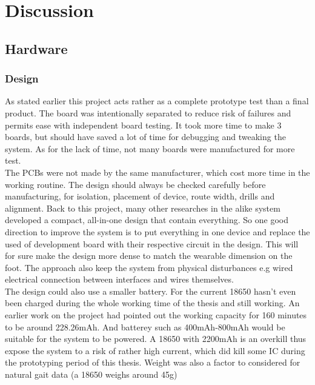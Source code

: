 \documentclass[12 pt, a4paper]{thesis}
\begin{document}
\chapter{Discussion}
\section{Hardware}
\subsection{Design}
As stated earlier this project acts rather as a complete prototype test than a final product. The board was intentionally separated to reduce risk of failures and permits ease with independent board testing. It took more time to make 3 boards, but should have saved a lot of time for debugging and tweaking the system. As for the lack of time, not many boards were manufactured for more test.\\
The PCBs were not made by the same manufacturer, which cost more time in the working routine. The design should always be checked carefully before manufacturing, for isolation, placement of device, route width, drills and alignment. Back to this project, many other researches in the alike system developed a compact, all-in-one design that contain everything\cite{Shuo}\cite{Kim}\cite{Nilsson}. So one good direction to improve the system is to put everything in one device and replace the used of development board with their respective circuit in the design. This will for sure make the design more dense to match the wearable dimension on the foot. The approach also keep the system from physical disturbances e.g wired electrical connection between interfaces and wires themselves.\\
The design could also use a smaller battery. For the current 18650 hasn't even been charged during the whole working time of the thesis and still working. An earlier work on the project had pointed out the working capacity for 160 minutes to be around 228.26mAh. And batterey such as 400mAh-800mAh would be suitable for the system to be powered. A 18650 with 2200mAh is an overkill thus expose the system to a risk of rather high current, which did kill some IC during the prototyping period of this thesis. Weight was also a factor to considered for natural gait data (a 18650 weighs around 45g)\\ 
\end{document}
